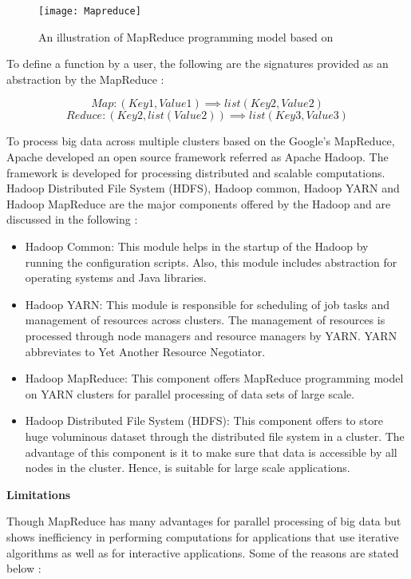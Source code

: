 \begin{figure}[htbp]
	\centering
		\texttt{[image: Mapreduce]}
	\caption{An illustration of MapReduce programming model based on \cite{elsayed2008pairwise}}
	\label{fig: Mapreduce}
\end{figure}

\par To define a function by a user, the following are the signatures provided as an abstraction by the MapReduce 
\cite{elsayed2008pairwise}:

\[Map: (Key1,Value1) \implies list(Key2,Value2)\]
\[Reduce: (Key2,list(Value2)) \implies list(Key3,Value3)\]


To process big data across multiple clusters based on the Google's MapReduce, Apache developed an open source framework referred as Apache Hadoop. The framework is developed for processing distributed and scalable computations. Hadoop Distributed File System (HDFS), Hadoop common, Hadoop YARN and Hadoop MapReduce are the major components offered by the Hadoop and are discussed in the following \cite{website:hadoop}:

\begin{itemize}
\item Hadoop Common: This module helps in the startup of the Hadoop by running the configuration scripts. Also, this module includes abstraction for operating systems and Java libraries.

\item Hadoop YARN: This module is responsible for scheduling of job tasks and management of resources across clusters. The management of resources is processed through node managers and resource managers by YARN. YARN abbreviates to Yet Another Resource Negotiator. 

\item Hadoop MapReduce: This component offers MapReduce programming model on YARN clusters for parallel processing of data sets of large scale.

\item Hadoop Distributed File System (HDFS): This component offers to store huge voluminous dataset through the distributed file system in a cluster. The advantage of this component is it to make sure that data is accessible by all nodes in the cluster. Hence, is suitable for large scale applications.

\end{itemize}


\textbf{Limitations}
\par Though MapReduce has many advantages for parallel processing of big data but shows inefficiency in performing computations for applications that use iterative algorithms as well as for interactive applications. Some of the reasons are stated below \cite{Jonnalagadda2016}:

